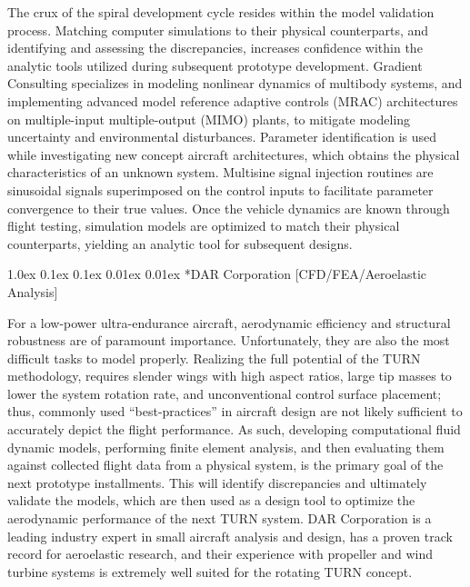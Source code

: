 \documentclass[11pt]{article}
\makeatletter
\renewcommand\subsection{
\@startsection{subsection}{2}{\z@}%
{1.0ex \@plus 0.1ex \@minus 0.1ex}%
{0.01ex \@plus 0.01ex}%
{\normalfont\Large\bfseries}}
\makeatother
\begin{document}
The crux of the spiral development cycle resides within the model validation process.  Matching computer simulations to their physical counterparts, and identifying and assessing the discrepancies, increases confidence within the analytic tools utilized during subsequent prototype development.  Gradient Consulting specializes in modeling nonlinear dynamics of multibody systems, and implementing advanced model reference adaptive controls (MRAC) architectures on multiple-input multiple-output (MIMO) plants, to mitigate modeling uncertainty and environmental disturbances.  Parameter identification is used while investigating new concept aircraft architectures, which obtains the physical characteristics of an unknown system.  Multisine signal injection routines are sinusoidal signals superimposed on the control inputs to facilitate parameter convergence to their true values.  Once the vehicle dynamics are known through flight testing, simulation models are optimized to match their physical counterparts, yielding an analytic tool for subsequent designs.




\subsection*{DAR Corporation [CFD/FEA/Aeroelastic Analysis]}

For a low-power ultra-endurance aircraft, aerodynamic efficiency and structural robustness are of paramount importance.  Unfortunately, they are also the most difficult tasks to model properly.  Realizing the full potential of the TURN methodology, requires slender wings with high aspect ratios, large tip masses to lower the system rotation rate, and unconventional control surface placement; thus, commonly used ``best-practices'' in aircraft design are not likely sufficient to accurately depict the flight performance.  As such, developing computational fluid dynamic models, performing finite element analysis, and then evaluating them against collected flight data from a physical system, is the primary goal of the next prototype installments.  This will identify discrepancies and ultimately validate the models, which are then used as a design tool to optimize the aerodynamic performance of the next TURN system.  DAR Corporation is a leading industry expert in small aircraft analysis and design, has a proven track record for aeroelastic research, and their experience with propeller and wind turbine systems is extremely well suited for the rotating TURN concept.
\end{document}

